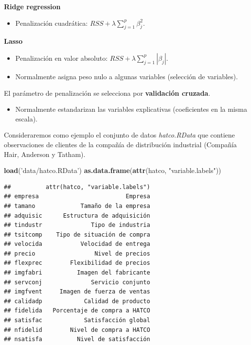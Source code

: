 \documentclass[]{book}
\newenvironment{Shaded}{\begin{snugshade}}{\end{snugshade}}
\newcommand{\KeywordTok}[1]{\textcolor[rgb]{0.13,0.29,0.53}{\textbf{#1}}}
\newcommand{\StringTok}[1]{\textcolor[rgb]{0.31,0.60,0.02}{#1}}
\newcommand{\NormalTok}[1]{#1}
\providecommand{\tightlist}{%
  \setlength{\itemsep}{0pt}\setlength{\parskip}{0pt}}
\begin{document}
\textbf{Ridge regression}

\begin{itemize}
\tightlist
\item
  Penalización cuadrática: \(RSS+\lambda\sum_{j=1}^{p}\beta_{j}^{2}\).
\end{itemize}

\textbf{Lasso}

\begin{itemize}
\item
  Penalización en valor absoluto:
  \(RSS+\lambda\sum_{j=1}^{p}|\beta_{j}|\).
\item
  Normalmente asigna peso nulo a algunas variables (selección de
  variables).
\end{itemize}

El parámetro de penalización se selecciona por \textbf{validación
cruzada}.

\begin{itemize}
\tightlist
\item
  Normalmente estandarizan las variables explicativas (coeficientes en
  la misma escala).
\end{itemize}

Consideraremos como ejemplo el conjunto de datos \emph{hatco.RData} que
contiene observaciones de clientes de la compañía de distribución
industrial (Compañía Hair, Anderson y Tatham).

\begin{Shaded}
\begin{Highlighting}[]
\KeywordTok{load}\NormalTok{(}\StringTok{'data/hatco.RData'}\NormalTok{)}
\KeywordTok{as.data.frame}\NormalTok{(}\KeywordTok{attr}\NormalTok{(hatco, }\StringTok{"variable.labels"}\NormalTok{))}
\end{Highlighting}
\end{Shaded}

\begin{verbatim}
##          attr(hatco, "variable.labels")
## empresa                         Empresa
## tamano             Tamaño de la empresa
## adquisic      Estructura de adquisición
## tindustr              Tipo de industria
## tsitcomp    Tipo de situación de compra
## velocida           Velocidad de entrega
## precio                 Nivel de precios
## flexprec        Flexibilidad de precios
## imgfabri          Imagen del fabricante
## servconj              Servicio conjunto
## imgfvent     Imagen de fuerza de ventas
## calidadp            Calidad de producto
## fidelida   Porcentaje de compra a HATCO
## satisfac            Satisfacción global
## nfidelid        Nivel de compra a HATCO
## nsatisfa          Nivel de satisfacción
\end{verbatim}
\end{document}
